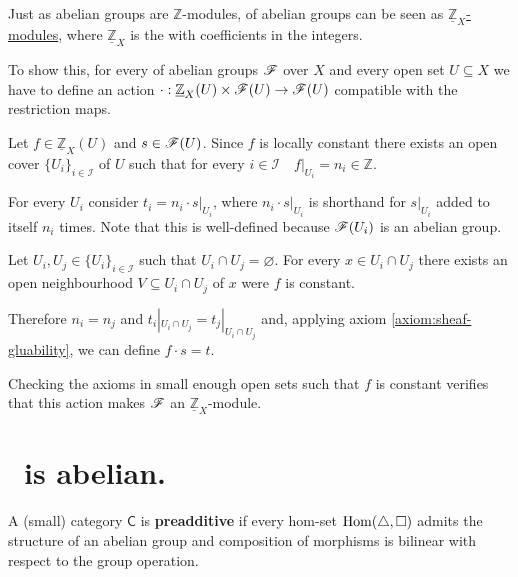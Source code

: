 \documentclass[../main.tex]{subfiles}
\begin{document}
Just as abelian groups are \(\mathbb{Z}\)-modules,  of abelian groups can be seen as \href{def:ox-mod}{\(\underline{\mathbb{Z}}_{X}\)-modules}, where \(\underline{\mathbb{Z}}_{X}\) is the  with coefficients in the integers.

To show this, for every  of abelian groups \(\mathscr{F}\) over \(X\) and every open set \(U \subseteq X\) we have to define an action \(\cdot: \underline{\mathbb{Z}}_{X}(U) \times \mathscr{F}(U) \to \mathscr{F}(U)\) compatible with the restriction maps.

Let \(f \in \underline{\mathbb{Z}}_{X}(U)\) and \(s \in \mathscr{F}(U)\).
Since \(f\) is locally constant there exists an open cover \(\{U_{i}\}_{i \in \mathcal{I}}\) of \(U\) such that for every \(i \in \mathcal{I} \quad f|_{U_{i}} = n_{i} \in \mathbb{Z}\).

For every \(U_{i}\) consider \(t_{i} = n_{i} \cdot s|_{U_{i}}\), where \(n_{i} \cdot s|_{U_{i}}\) is shorthand for \(s|_{U_{i}}\) added to itself \(n_{i}\) times.
Note that this is well-defined because \(\mathscr{F}(U_{i})\) is an abelian group.

Let \(U_{i}, U_{j} \in \{U_{i}\}_{i \in \mathcal{I}}\) such that \(U_{i} \cap U_{j} = \varnothing\).
For every \(x \in U_{i} \cap U_{j}\) there exists an open neighbourhood \(V \subseteq U_{i} \cap U_{j}\) of \(x\) were \(f\) is constant.

Therefore \(n_{i} = n_{j}\) and \(t_{i}|_{U_{i} \cap U_{j}} = t_{j}|_{U_{i} \cap U_{j}}\) and, applying axiom \ref{axiom:sheaf-gluability}, we can define \(f \cdot s = t\).

Checking the axioms in small enough open sets such that \(f\) is constant verifies that this action makes \(\mathscr{F}\) an \(\underline{\mathbb{Z}}_{X}\)-module.

\section{\oxmod\ is abelian.}


\begin{definition} \label{def:preadditive-category}
  A (small) category \(\mathsf{C}\) is \textbf{preadditive} if every hom-set \(\operatorname{Hom}(\triangle, \square)\) admits the structure of an abelian group and composition of morphisms is bilinear with respect to the group operation.
\end{definition}
\end{document}
